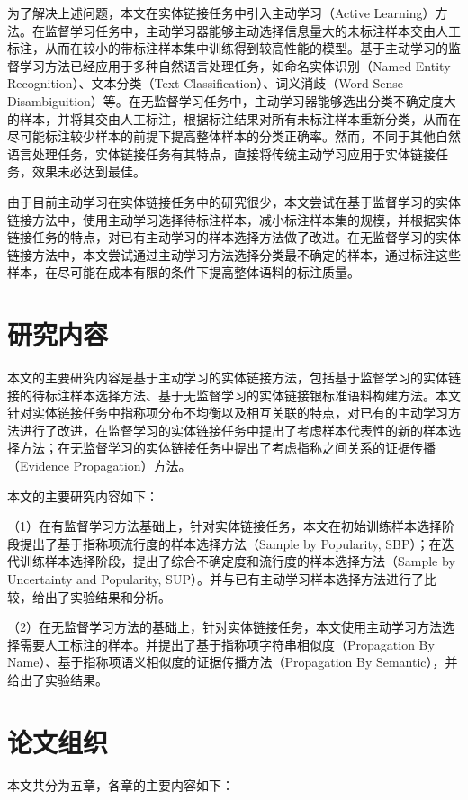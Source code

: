 为了解决上述问题，本文在实体链接任务中引入主动学习（Active Learning）方法。在监督学习任务中，主动学习器能够主动选择信息量大的未标注样本交由人工标注，从而在较小的带标注样本集中训练得到较高性能的模型。基于主动学习的监督学习方法已经应用于多种自然语言处理任务，如命名实体识别（Named Entity Recognition）\cite{ALMNERICT}、文本分类（Text Classification）\cite{SCALRHRTC}、词义消歧（Word Sense Disambiguition）\cite{ALSWSDIM}等。在无监督学习任务中，主动学习器能够选出分类不确定度大的样本，并将其交由人工标注，根据标注结果对所有未标注样本重新分类，从而在尽可能标注较少样本的前提下提高整体样本的分类正确率\cite{UALHGC}。然而，不同于其他自然语言处理任务，实体链接任务有其特点，直接将传统主动学习应用于实体链接任务，效果未必达到最佳。

由于目前主动学习在实体链接任务中的研究很少，本文尝试在基于监督学习的实体链接方法中，使用主动学习选择待标注样本，减小标注样本集的规模，并根据实体链接任务的特点，对已有主动学习的样本选择方法做了改进。在无监督学习的实体链接方法中，本文尝试通过主动学习方法选择分类最不确定的样本，通过标注这些样本，在尽可能在成本有限的条件下提高整体语料的标注质量。

\section{研究内容}
本文的主要研究内容是基于主动学习的实体链接方法，包括基于监督学习的实体链接的待标注样本选择方法、基于无监督学习的实体链接银标准语料构建方法。本文针对实体链接任务中指称项分布不均衡以及相互关联的特点，对已有的主动学习方法进行了改进，在监督学习的实体链接任务中提出了考虑样本代表性的新的样本选择方法；在无监督学习的实体链接任务中提出了考虑指称之间关系的证据传播（Evidence Propagation）方法。

本文的主要研究内容如下：

（1）在有监督学习方法基础上，针对实体链接任务，本文在初始训练样本选择阶段提出了基于指称项流行度的样本选择方法（Sample by Popularity, SBP）；在迭代训练样本选择阶段，提出了综合不确定度和流行度的样本选择方法（Sample by Uncertainty and Popularity, SUP）。并与已有主动学习样本选择方法进行了比较，给出了实验结果和分析。

（2）在无监督学习方法的基础上，针对实体链接任务，本文使用主动学习方法选择需要人工标注的样本。并提出了基于指称项字符串相似度（Propagation By Name）、基于指称项语义相似度的证据传播方法（Propagation By Semantic），并给出了实验结果。

\section{论文组织}
本文共分为五章，各章的主要内容如下：

